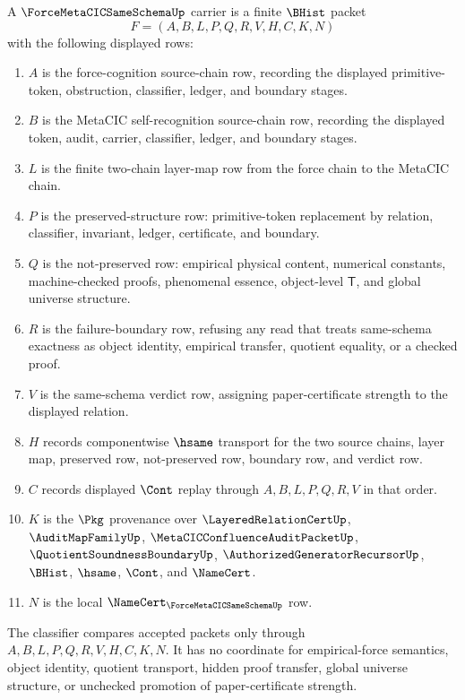 \begin{definition}
\label{def:force-metacic-same-schema-carrier}
A $\ForceMetaCICSameSchemaUp$ carrier is a finite $\BHist$ packet
$$
F=(A,B,L,P,Q,R,V,H,C,K,N)
$$
with the following displayed rows:
\begin{enumerate}
\item $A$ is the force-cognition source-chain row, recording the displayed primitive-token, obstruction, classifier, ledger, and boundary stages.
\item $B$ is the MetaCIC self-recognition source-chain row, recording the displayed token, audit, carrier, classifier, ledger, and boundary stages.
\item $L$ is the finite two-chain layer-map row from the force chain to the MetaCIC chain.
\item $P$ is the preserved-structure row: primitive-token replacement by relation, classifier, invariant, ledger, certificate, and boundary.
\item $Q$ is the not-preserved row: empirical physical content, numerical constants, machine-checked proofs, phenomenal essence, object-level $\mathsf{T}$, and global universe structure.
\item $R$ is the failure-boundary row, refusing any read that treats same-schema exactness as object identity, empirical transfer, quotient equality, or a checked proof.
\item $V$ is the same-schema verdict row, assigning paper-certificate strength to the displayed relation.
\item $H$ records componentwise $\hsame$ transport for the two source chains, layer map, preserved row, not-preserved row, boundary row, and verdict row.
\item $C$ records displayed $\Cont$ replay through $A,B,L,P,Q,R,V$ in that order.
\item $K$ is the $\Pkg$ provenance over $\LayeredRelationCertUp$, $\AuditMapFamilyUp$, $\MetaCICConfluenceAuditPacketUp$, $\QuotientSoundnessBoundaryUp$, $\AuthorizedGeneratorRecursorUp$, $\BHist$, $\hsame$, $\Cont$, and $\NameCert$.
\item $N$ is the local $\NameCert_{\ForceMetaCICSameSchemaUp}$ row.
\end{enumerate}
The classifier compares accepted packets only through $A,B,L,P,Q,R,V,H,C,K,N$. It has no coordinate for empirical-force semantics, object identity, quotient transport, hidden proof transfer, global universe structure, or unchecked promotion of paper-certificate strength.
\end{definition}

